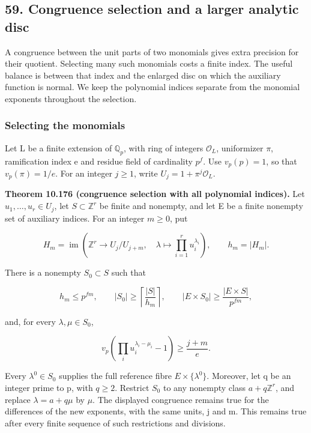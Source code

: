 \documentclass[
  11pt,
  a4paper,
]{article}
\newcounter{none} %
\begin{document}
\subsection{59. Congruence selection and a larger analytic
disc}\label{congruence-selection-and-a-larger-analytic-disc}

A congruence between the unit parts of two monomials gives extra
precision for their quotient. Selecting many such monomials costs a
finite index. The useful balance is between that index and the enlarged
disc on which the auxiliary function is normal. We keep the polynomial
indices separate from the monomial exponents throughout the selection.

\subsubsection{Selecting the monomials}\label{selecting-the-monomials}

Let L be a finite extension of \(\mathbb Q_p\), with ring of integers
\(\mathcal O_L\), uniformizer \(\pi\), ramification index e and residue
field of cardinality \(p^f\). Use \(v_p(p)=1\), so that
\(v_p(\pi)=1/e\). For an integer \(j\ge1\), write
\(U_j=1+\pi^j\mathcal O_L\).

\textbf{Theorem 10.176 (congruence selection with all polynomial
indices).} Let \(u_1,\ldots,u_r\in U_j\), let \(S\subset\mathbb Z^r\) be
finite and nonempty, and let E be a finite nonempty set of auxiliary
indices. For an integer \(m\ge0\), put

\[
H_m=\operatorname{im}\left(\mathbb Z^r\longrightarrow U_j/U_{j+m},
      \quad\lambda\longmapsto\prod_{i=1}^ru_i^{\lambda_i}\right),
\qquad h_m=|H_m|.
\tag{10.659}
\]

There is a nonempty \(S_0\subset S\) such that

\[
h_m\le p^{fm},\qquad
|S_0|\ge\left\lceil\frac{|S|}{h_m}\right\rceil,
\qquad |E\times S_0|\ge\frac{|E\times S|}{p^{fm}},
\tag{10.660}
\]

and, for every \(\lambda,\mu\in S_0\),

\[
v_p\left(\prod_i u_i^{\lambda_i-\mu_i}-1\right)
\ge\frac{j+m}{e}.
\tag{10.661}
\]

Every \(\lambda^0\in S_0\) supplies the full reference fibre
\(E\times\{\lambda^0\}\). Moreover, let q be an integer prime to p, with
\(q\ge2\). Restrict \(S_0\) to any nonempty class \(a+q\mathbb Z^r\),
and replace \(\lambda=a+q\mu\) by \(\mu\). The displayed congruence
remains true for the differences of the new exponents, with the same
units, j and m. This remains true after every finite sequence of such
restrictions and divisions.
\end{document}
